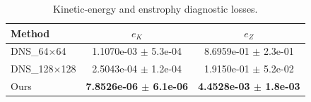 \begin{table}[t]
\centering
\caption{Kinetic-energy and enstrophy diagnostic losses.}
\label{tab:ke_enstrophy_losses}
\begin{tabular}{lcc}
\toprule
Method & $e_K$ & $e_Z$ \\
\midrule
DNS\_64$\times$64 & 1.1070e-03 $\pm$ 5.3e-04 & 8.6959e-01 $\pm$ 2.3e-01 \\
DNS\_128$\times$128 & 2.5043e-04 $\pm$ 1.2e-04 & 1.9150e-01 $\pm$ 5.2e-02 \\
Ours & \textbf{7.8526e-06 $\pm$ 6.1e-06} & \textbf{4.4528e-03 $\pm$ 1.8e-03} \\
\bottomrule
\end{tabular}
\end{table}